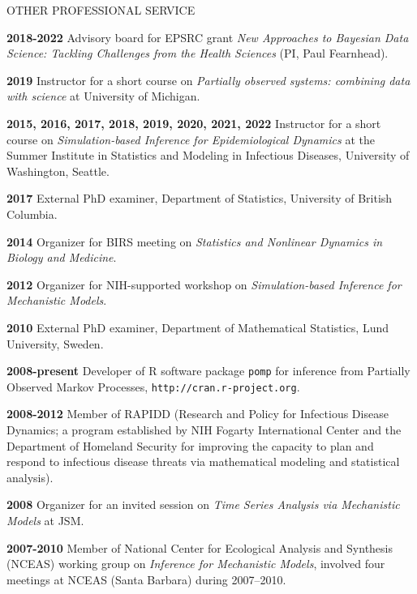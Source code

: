 \begin{mylist}{OTHER PROFESSIONAL SERVICE}

\item{\bf 2018-2022 } Advisory board for EPSRC grant {\it New Approaches to Bayesian Data Science: Tackling Challenges from the Health Sciences}  (PI, Paul Fearnhead).

\item{\bf 2019 } Instructor for a short course on {\it Partially observed systems: combining data with science} at University of Michigan.

\item{\bf 2015, 2016, 2017, 2018, 2019, 2020, 2021, 2022 } Instructor for a short course on {\it Simulation-based Inference for Epidemiological Dynamics} at the Summer Institute in Statistics and Modeling in Infectious Diseases, University of Washington, Seattle.

\item{\bf 2017 } External PhD examiner, Department of Statistics, University of British Columbia.

\item{\bf 2014 } Organizer for BIRS meeting on {\it Statistics and Nonlinear Dynamics in Biology and Medicine}.

\item{\bf 2012 } Organizer for NIH-supported workshop on {\it Simulation-based Inference for Mechanistic Models}.

\item{\bf 2010 } External PhD examiner, 
Department of Mathematical Statistics, Lund University, Sweden.

\item{\bf 2008-present } Developer of R software package {\texttt{pomp}} for inference from Partially Observed Markov Processes, {\texttt{http://cran.r-project.org}}.

\item{\bf 2008-2012 } Member of RAPIDD (Research and Policy for Infectious Disease Dynamics; a program established by NIH Fogarty International Center and the Department of Homeland Security for improving the capacity to plan and respond to infectious disease threats via mathematical modeling and statistical analysis).

\item{\bf 2008 } Organizer for an invited session on {\it Time Series Analysis via Mechanistic Models} at JSM.

\item {\bf 2007-2010 } Member of National Center for Ecological Analysis and Synthesis (NCEAS) working group on {\it Inference for Mechanistic Models}, involved four meetings at NCEAS (Santa Barbara) during 2007--2010.
 


\end{mylist}

